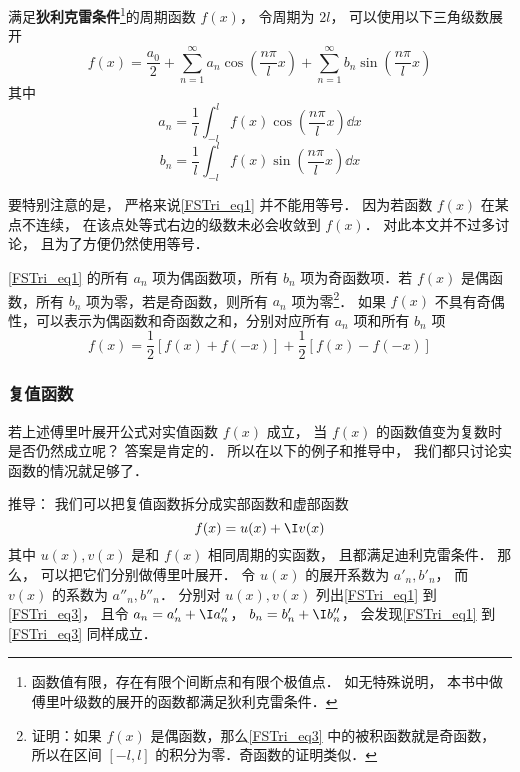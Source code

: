 


满足\textbf{狄利克雷条件}\footnote{函数值有限，存在有限个间断点和有限个极值点． 如无特殊说明， 本书中做傅里叶级数的展开的函数都满足狄利克雷条件．}的周期函数 $f(x)$， 令周期为 $2l$， 可以使用以下三角级数展开
\begin{equation}\label{FSTri_eq1}
f( x ) = \frac{a_0}{2} + \sum_{n = 1}^\infty a_n \cos (\frac{n\pi}{l}x) + \sum_{n = 1}^\infty b_n \sin (\frac{n\pi}{l}x)
\end{equation}
其中
\begin{equation}\label{FSTri_eq2}
a_n = \frac{1}{l} \int_{ - l}^l f( x )\cos(\frac{n\pi}{l}x) \dd{x} 
\end{equation}
\begin{equation}\label{FSTri_eq3}
b_n = \frac{1}{l} \int_{ - l}^l f( x )\sin(\frac{n\pi}{l}x) \dd{x}
\end{equation}

要特别注意的是， 严格来说\autoref{FSTri_eq1} 并不能用等号． 因为若函数 $f(x)$ 在某点不连续， 在该点处等式右边的级数未必会收敛到 $f(x)$． 对此本文并不过多讨论， 且为了方便仍然使用等号．

\autoref{FSTri_eq1} 的所有 $a_n$ 项为偶函数项，所有 $b_n$ 项为奇函数项．若 $f(x)$ 是偶函数，所有 $b_n$ 项为零，若是奇函数，则所有 $a_n$ 项为零\footnote{证明：如果 $f(x)$ 是偶函数，那么\autoref{FSTri_eq3} 中的被积函数就是奇函数， 所以在区间 $[-l,l]$ 的积分为零．奇函数的证明类似．}． 如果 $f(x)$ 不具有奇偶性，可以表示为偶函数和奇函数之和，分别对应所有 $a_n$ 项和所有 $b_n$ 项
\begin{equation}
f(x) = \frac12 [f(x)+f(-x)] + \frac12 [f(x)-f(-x)]
\end{equation}

\subsubsection{复值函数}
若上述傅里叶展开公式对实值函数 $f(x)$ 成立， 当 $f(x)$ 的函数值变为复数时是否仍然成立呢？ 答案是肯定的． 所以在以下的例子和推导中， 我们都只讨论实函数的情况就足够了．

推导： 我们可以把复值函数拆分成实部函数和虚部函数
\begin{equation}
f(x) = u(x) + \I v(x)
\end{equation}
其中 $u(x), v(x)$ 是和 $f(x)$ 相同周期的实函数， 且都满足迪利克雷条件． 那么， 可以把它们分别做傅里叶展开． 令 $u(x)$ 的展开系数为 $a'_n, b'_n$， 而 $v(x)$ 的系数为 $a''_n, b''_n$． 分别对 $u(x), v(x)$ 列出\autoref{FSTri_eq1} 到\autoref{FSTri_eq3}， 且令 $a_n = a'_n + \I a''_n$， $b_n = b'_n + \I b''_n$， 会发现\autoref{FSTri_eq1} 到\autoref{FSTri_eq3} 同样成立．


